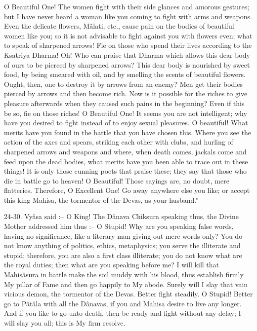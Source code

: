 O Beautiful One! The women fight with their side glances and amorous gestures; but I have never heard a woman like you coming to fight with arms and weapons. Even the delicate flowers, M\^alati, etc., cause pain on the bodies of beautiful women like you; so it is not advisable to fight against you with flowers even; what to speak of sharpened arrows! Fie on those who spend their lives according to the Ksatriya Dharma! Oh! Who can praise that Dharma which allows this dear body of ours to be pierced by sharpened arrows? This dear body is nourished by sweet food, by being smeared with oil, and by smelling the scents of beautiful flowers. Ought, then, one to destroy it by arrows from an enemy? Men get their bodies pierced by arrows and then become rich. Now is it possible for the riches to give pleasure afterwards when they caused such pains in the beginning? Even if this be so, fie on those riches! O Beautiful One! It seems you are not intelligent; why have you desired to fight instead of to enjoy sexual pleasures. O beautiful! What merits have you found in the battle that you have chosen this. Where you see the action of the axes and spears, striking each other with clubs, and hurling of sharpened arrows and weapons and where, when death comes, jackals come and feed upon the dead bodies, what merits have you been able to trace out in these things! It is only those cunning poets that praise these; they say that those who die in battle go to heaven! O Beautiful! Those sayings are, no doubt, mere flatteries. Therefore, O Excellent One! Go away anywhere else you like; or accept this king Mahisa, the tormentor of the Devas, as your husband.''

24-30. Vy\^asa said :-- O King! The D\^anava Chiksura speaking thus, the Divine Mother addressed him thus :-- O Stupid! Why are you speaking false words, having no significance, like a literary man giving out mere words only? You do not know anything of politics, ethics, metaphysics; you serve the illiterate and stupid; therefore, you are also a first class illiterate; you do not know what are the royal duties; then what are you speaking before me? I will kill that Mahis\^asura in battle make the soil muddy with his blood, thus establish firmly My pillar of Fame and then go happily to My abode. Surely will I slay that vain vicious demon, the tormentor of the Devas. Better fight steadily. O Stupid! Better go to P\^at\^ala with all the D\^anavas, if you and Mahisa desire to live any longer. And if you like to go unto death, then be ready and fight without any delay; I will slay you all; this is My firm resolve.

